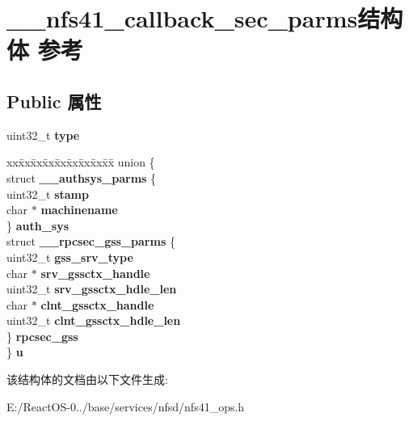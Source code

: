 \hypertarget{struct____nfs41__callback__sec__parms}{}\section{\+\_\+\+\_\+nfs41\+\_\+callback\+\_\+sec\+\_\+parms结构体 参考}
\label{struct____nfs41__callback__sec__parms}
\subsection*{Public 属性}
\begin{DoxyCompactItemize}
\item 
\mbox{\label{struct____nfs41__callback__sec__parms_a0be376d604b3b93e1941a9cebf15eb0e}} 
uint32\+\_\+t {\bfseries type}
\item 
\mbox{\label{struct____nfs41__callback__sec__parms_a6d44a4f96c5ba389909afca28d5f3873}} 
\begin{tabbing}
xx\=xx\=xx\=xx\=xx\=xx\=xx\=xx\=xx\=\kill
union \{\\
\>struct {\bfseries \_\_authsys\_parms} \{\\
\>\>uint32\_t {\bfseries stamp}\\
\>\>char $\ast$ {\bfseries machinename}\\
\>\} {\bfseries auth\_sys}\\
\>struct {\bfseries \_\_rpcsec\_gss\_parms} \{\\
\>\>uint32\_t {\bfseries gss\_srv\_type}\\
\>\>char $\ast$ {\bfseries srv\_gssctx\_handle}\\
\>\>uint32\_t {\bfseries srv\_gssctx\_hdle\_len}\\
\>\>char $\ast$ {\bfseries clnt\_gssctx\_handle}\\
\>\>uint32\_t {\bfseries clnt\_gssctx\_hdle\_len}\\
\>\} {\bfseries rpcsec\_gss}\\
\} {\bfseries u}\\

\end{tabbing}\end{DoxyCompactItemize}


该结构体的文档由以下文件生成\+:\begin{DoxyCompactItemize}
\item 
E\+:/\+React\+O\+S-\/0../base/services/nfsd/nfs41\+\_\+ops.\+h\end{DoxyCompactItemize}
